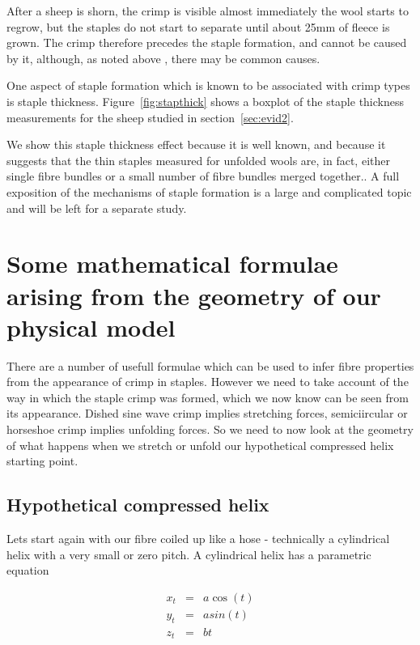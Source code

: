 \documentclass[titlepage,10pt]{article}  %
\begin{document}
After a sheep is shorn, the crimp is visible almost immediately the wool starts to regrow, but the staples do not start to separate until about 25mm of fleece is grown. The crimp therefore precedes the staple formation, and cannot be caused by it, although, as noted above , there may be common causes.

One aspect of staple formation which is known to be associated with crimp types is staple thickness. Figure~\ref{fig:stapthick} shows a boxplot of the staple thickness measurements for the sheep studied in section~\ref{sec:evid2}.




We show this staple thickness effect because it is well known, and because it suggests that the thin staples measured for unfolded wools are, in fact, either single fibre bundles or a small number of fibre bundles merged together.. A full exposition of the mechanisms of staple formation is a large and complicated topic and will be left for a separate study.


\clearpage
\section{Some mathematical formulae arising from the geometry of our physical model}
\label{sec:math}
There are a number of  usefull formulae which can be used to infer fibre properties from the appearance of crimp in staples. However we need to take account of the way in which the staple crimp was formed, which we now know can be seen from its appearance. Dished sine wave crimp implies stretching forces, semiciircular or horseshoe crimp implies unfolding forces. So we need to now look at the geometry of what happens when we stretch or unfold our hypothetical compressed helix starting point.

\subsection{Hypothetical compressed helix}
\label{sec:helix}
Lets start again with our fibre coiled up like a hose - technically a cylindrical helix with a very small or zero pitch. A cylindrical helix has a parametric equation

\begin{eqnarray*}
x_{t} & = & a \cos(t) \\
y_{t} & = & a sin(t) \\
z_{t} & = & b t
\end{eqnarray*}
\end{document}
